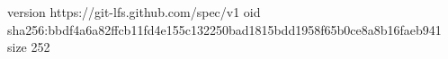 version https://git-lfs.github.com/spec/v1
oid sha256:bbdf4a6a82ffcb11fd4e155c132250bad1815bdd1958f65b0ce8a8b16faeb941
size 252
